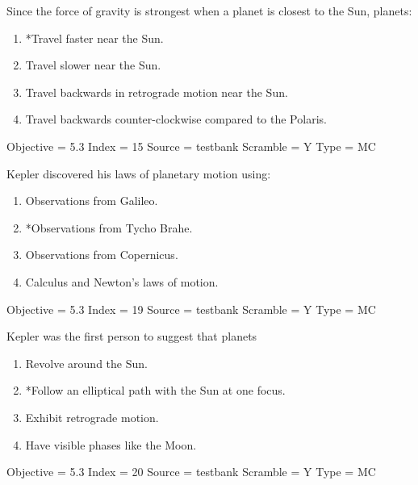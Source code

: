 \documentclass[11pt]{article}
\begin{document}
\begin{enumerate}
\begin{minipage}{\textwidth}
\begin{minipage}{\textwidth}
\item Since the force of gravity is strongest when a planet is closest to the Sun, planets:
\begin{enumerate} 
\setlength{\itemsep}{1pt} 
\setlength{\parskip}{0pt} 
\setlength{\parsep}{0pt}
\setlength{\multicolsep}{1pt} 
\item *Travel faster near the Sun.
\item Travel slower near the Sun.
\item Travel backwards in retrograde motion near the Sun.
\item Travel backwards counter-clockwise compared to the Polaris.
\end{enumerate} 
Objective = 5.3
Index = 15
Source = testbank
Scramble = Y
Type = MC
\end{minipage}
\end{minipage}
\vskip 0.20in

\begin{minipage}{\textwidth}
\begin{minipage}{\textwidth}
\item Kepler discovered his laws of planetary motion using:
\begin{multicols}{2}
\begin{enumerate} 
\setlength{\itemsep}{1pt} 
\setlength{\parskip}{0pt} 
\setlength{\parsep}{0pt}
\setlength{\multicolsep}{1pt} 
\item Observations from Galileo.
\item *Observations from Tycho Brahe.
\item Observations from Copernicus.
\item Calculus and Newton's laws of motion.
\end{enumerate} 
\vfill 
\end{multicols}

Objective = 5.3
Index = 19
Source = testbank
Scramble = Y
Type = MC
\end{minipage}
\end{minipage}
\vskip 0.20in

\begin{minipage}{\textwidth}
\begin{minipage}{\textwidth}
\item Kepler was the first person to suggest that planets
\begin{enumerate} 
\setlength{\itemsep}{1pt} 
\setlength{\parskip}{0pt} 
\setlength{\parsep}{0pt}
\setlength{\multicolsep}{1pt} 
\item Revolve around the Sun.
\item *Follow an elliptical path with the Sun at one focus.
\item Exhibit retrograde motion.
\item Have visible phases like the Moon.
\end{enumerate} 
Objective = 5.3
Index = 20
Source = testbank
Scramble = Y
Type = MC
\end{minipage}
\end{minipage}
\vskip 0.20in


\end{enumerate}
\end{document}
